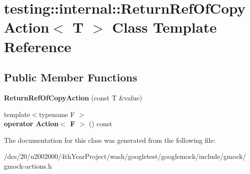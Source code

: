 \hypertarget{classtesting_1_1internal_1_1ReturnRefOfCopyAction}{}\section{testing\+:\+:internal\+:\+:Return\+Ref\+Of\+Copy\+Action$<$ T $>$ Class Template Reference}
\label{classtesting_1_1internal_1_1ReturnRefOfCopyAction}
\subsection*{Public Member Functions}
\begin{DoxyCompactItemize}
\item 
\mbox{\label{classtesting_1_1internal_1_1ReturnRefOfCopyAction_a073c18a8b50423b08f6603e860622839}} 
{\bfseries Return\+Ref\+Of\+Copy\+Action} (const T \&value)
\item 
\mbox{\label{classtesting_1_1internal_1_1ReturnRefOfCopyAction_a8b4829fbb46c3ca6468f3eb5c5b42493}} 
{\footnotesize template$<$typename F $>$ }\\{\bfseries operator Action$<$ F $>$} () const
\end{DoxyCompactItemize}


The documentation for this class was generated from the following file\+:\begin{DoxyCompactItemize}
\item 
/dcs/20/u2002000/4th\+Year\+Project/wash/googletest/googlemock/include/gmock/gmock-\/actions.\+h\end{DoxyCompactItemize}
